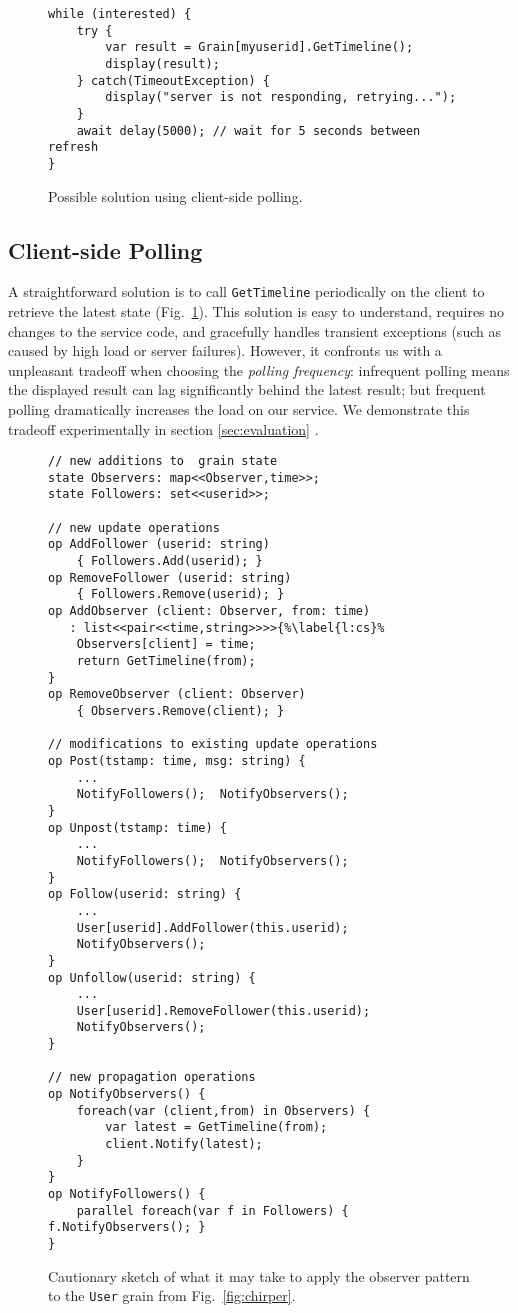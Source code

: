 \begin{figure}
\begin{lstlisting}
while (interested) {
	try {
		var result = Grain[myuserid].GetTimeline();
		display(result);
	} catch(TimeoutException) { 
		display("server is not responding, retrying...");
	}  
	await delay(5000); // wait for 5 seconds between refresh
}
\end{lstlisting}
\caption{Possible solution using client-side polling.}\label{fig:polling}
\end{figure}

\subsection{Client-side Polling}\label{sec:polling}

 A straightforward solution is to call \lstinline|GetTimeline| periodically on the client to retrieve the latest state (Fig.~\ref{fig:polling}). This solution is easy to understand, requires no changes to the service code, and gracefully handles transient exceptions (such as caused by high load or server failures). However, it confronts us with a unpleasant tradeoff when choosing the \emph{polling frequency}: infrequent polling means the displayed result can lag significantly behind the latest result; but frequent polling dramatically increases the load on our service. We demonstrate this tradeoff experimentally in section \ref{sec:evaluation} .

\begin{figure}
\begin{lstlisting}
// new additions to  grain state
state Observers: map<<Observer,time>>; 
state Followers: set<<userid>>; 	

// new update operations
op AddFollower (userid: string)
	{ Followers.Add(userid); }
op RemoveFollower (userid: string)
	{ Followers.Remove(userid); }
op AddObserver (client: Observer, from: time)
   : list<<pair<<time,string>>>>{%\label{l:cs}%
 	Observers[client] = time; 
 	return GetTimeline(from);
}
op RemoveObserver (client: Observer)
	{ Observers.Remove(client); }

// modifications to existing update operations
op Post(tstamp: time, msg: string) { 
	...
	NotifyFollowers();  NotifyObservers();
} 
op Unpost(tstamp: time) { 
	...
	NotifyFollowers();  NotifyObservers();
}
op Follow(userid: string) {  
	... 
	User[userid].AddFollower(this.userid);
	NotifyObservers();
}
op Unfollow(userid: string) { 
	...  
	User[userid].RemoveFollower(this.userid);
	NotifyObservers(); 
}

// new propagation operations
op NotifyObservers() {
	foreach(var (client,from) in Observers) {
		var latest = GetTimeline(from);
		client.Notify(latest);
	}
}
op NotifyFollowers() {
	parallel foreach(var f in Followers) { f.NotifyObservers(); }
}
\end{lstlisting}
\caption{Cautionary sketch of what it may take to apply the observer pattern to the \lstinline|User| grain from Fig.~\ref{fig:chirper}.}\label{fig:observers}
\end{figure}


